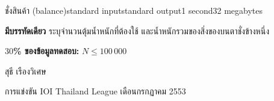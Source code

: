 \documentclass[11pt,a4paper]{article}
\begin{document}
\begin{problem}{ชั่งสินค้า (balance)}{standard input}{standard output}{1 second}{32 megabytes}
\OutputFile

\textbf{มีบรรทัดเดียว} ระบุจำนวนตุ้มน้ำหนักที่ต้องใช้ และน้ำหนักรวมของสิ่งของบนตาชั่งข้างหนึ่ง

\Examples

\begin{example}
%
%
\end{example}

\Scoring

\textbf{$30$\% ของข้อมูลทดสอบ:} $N \leq 100\,000$

\Source

สุธี เรืองวิเศษ

การแข่งขัน IOI Thailand League เดือนกรกฏาคม 2553


\end{problem}
\end{document}

